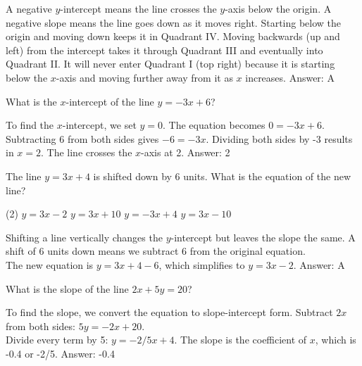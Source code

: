 \documentclass[11pt,paper=a4,answers]{exam}
\begin{document}
\begin{questions}
\begin{solution}
A negative $y$-intercept means the line crosses the $y$-axis below the origin. A negative slope means the line goes down as it moves right. Starting below the origin and moving down keeps it in Quadrant IV. Moving backwards (up and left) from the intercept takes it through Quadrant III and eventually into Quadrant II. It will never enter Quadrant I (top right) because it is starting below the $x$-axis and moving further away from it as $x$ increases.
\vspace{15pt}
Answer: \colorbox{yellow!100}{A}
\end{solution}

\question
What is the $x$-intercept of the line $y = -3x + 6$?

\begin{solution}
To find the $x$-intercept, we set $y = 0$. The equation becomes $0 = -3x + 6$.
\\[10pt]
Subtracting 6 from both sides gives $-6 = -3x$. Dividing both sides by -3 results in $x = 2$. The line crosses the $x$-axis at 2.
\vspace{15pt}
Answer: \colorbox{yellow!100}{2}
\end{solution}

\question
The line $y = 3x + 4$ is shifted down by 6 units. What is the equation of the new line?
\begin{tasks}(2)
    \task $y = 3x - 2$
    \task $y = 3x + 10$
    \task $y = -3x + 4$
    \task $y = 3x - 10$
\end{tasks}

\begin{solution}
Shifting a line vertically changes the $y$-intercept but leaves the slope the same. A shift of 6 units down means we subtract 6 from the original equation.
\\[10pt]
The new equation is $y = 3x + 4 - 6$, which simplifies to $y = 3x - 2$.
\vspace{15pt}
Answer: \colorbox{yellow!100}{A}
\end{solution}

\question
What is the slope of the line $2x + 5y = 20$?

\begin{solution}
To find the slope, we convert the equation to slope-intercept form. Subtract $2x$ from both sides: $5y = -2x + 20$. 
\\[10pt]
Divide every term by 5: $y = -2/5x + 4$. The slope is the coefficient of $x$, which is -0.4 or -2/5.
\vspace{15pt}
Answer: \colorbox{yellow!100}{-0.4}
\end{solution}


\end{questions}
\end{document}
